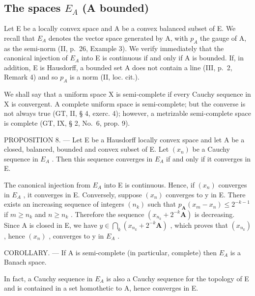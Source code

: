 \subsection{\texorpdfstring{The spaces \(E_{A}\) (A bounded)}{The spaces E\_\{A\} (A bounded)}}

Let E be a locally convex space and A be a convex balanced subset of E. We recall that \(E_{A}\) denotes the vector space generated by A, with \(p_{A}\) the gauge of A, as the semi-norm (II, p.~26, Example 3). We verify immediately that the canonical injection of \(E_{A}\) into E is continuous if and only if A is bounded. If, in addition, E is Hausdorff, a bounded set A does not contain a line (III, p.~2, Remark 4) and so \(p_{A}\) is a norm (II, loc. cit.).

We shall say that a uniform space X is semi-complete if every Cauchy sequence in X is convergent. A complete uniform space is semi-complete; but the converse is not always true (GT, II, § 4, exerc. 4); however, a metrizable semi-complete space is complete (GT, IX, § 2, No.~6, prop. 9).

PROPOSITION 8. --- Let E be a Hausdorff locally convex space and let A be a closed, balanced, bounded and convex subset of E. Let \((x_{n})\) be a Cauchy sequence in \(E_{A}\) . Then this sequence converges in \(E_{A}\) if and only if it converges in E.

The canonical injection from \(E_{A}\) into E is continuous. Hence, if \((x_{n})\) converges in \(E_{A}\) , it converges in E. Conversely, suppose \((x_{n})\) converges to y in E. There exists an increasing sequence of integers \((n_{k})\) such that \(p_{\mathbf{A}}(x_{m}-x_{n}) \leqslant 2^{-k-1}\) if \(m \geqslant n_{k}\) and \(n \geqslant n_{k}\) . Therefore the sequence \((x_{n_{k}} + 2^{-k}\mathbf{A})\) is decreasing. Since A is closed in E, we have \(y \in \bigcap_{k} (x_{n_{k}} + 2^{-k}\mathbf{A})\) , which proves that \((x_{n_{k}})\) , hence \((x_{n})\) , converges to y in \(E_{A}\) .

COROLLARY. --- If A is semi-complete (in particular, complete) then \(E_{A}\) is a Banach space.

In fact, a Cauchy sequence in \(E_{A}\) is also a Cauchy sequence for the topology of E and is contained in a set homothetic to A, hence converges in E.

